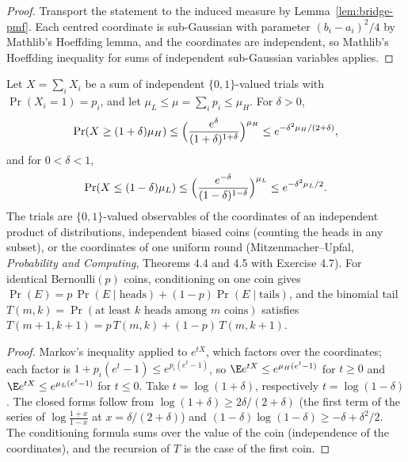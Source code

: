 \begin{proof}\leanok
Transport the statement to the induced measure by Lemma~\ref{lem:bridge-pmf}. Each centred
coordinate is sub-Gaussian with parameter $(b_i-a_i)^2/4$ by Mathlib's Hoeffding lemma, and the
coordinates are independent, so Mathlib's Hoeffding inequality for sums of independent
sub-Gaussian variables applies.
\end{proof}
\begin{theorem}\label{thm:chernoff}
\leanok{}
Let $X=\sum_iX_i$ be a sum of independent $\{0,1\}$-valued trials with
$\Pr(X_i=1)=p_i$, and let $\mu_L\le\mu=\sum_ip_i\le\mu_H$. For $\delta>0$,
\[\Pr(X\ge(1+\delta)\mu_H)\le\Bigl(\frac{e^{\delta}}{(1+\delta)^{1+\delta}}\Bigr)^{\mu_H}
\le e^{-\delta^2\mu_H/(2+\delta)},\]
and for $0<\delta<1$,
\[\Pr(X\le(1-\delta)\mu_L)\le\Bigl(\frac{e^{-\delta}}{(1-\delta)^{1-\delta}}\Bigr)^{\mu_L}
\le e^{-\delta^2\mu_L/2}.\]
The trials are $\{0,1\}$-valued observables of the coordinates of an independent
product of distributions, independent biased coins (counting the heads in any
subset), or the coordinates of one uniform round (Mitzenmacher--Upfal,
\emph{Probability and Computing}, Theorems 4.4 and 4.5 with Exercise 4.7).
For identical Bernoulli$(p)$ coins, conditioning on one coin gives
$\Pr(E)=p\,\Pr(E\mid\text{heads})+(1-p)\Pr(E\mid\text{tails})$, and the binomial tail
$T(m,k)=\Pr(\text{at least $k$ heads among $m$ coins})$ satisfies
$T(m+1,k+1)=p\,T(m,k)+(1-p)\,T(m,k+1)$.
\end{theorem}
\begin{proof}\leanok
Markov's inequality applied to $e^{tX}$, which factors over the coordinates; each
factor is $1+p_i(e^t-1)\le e^{p_i(e^t-1)}$, so $\E e^{tX}\le e^{\mu_H(e^t-1)}$ for
$t\ge0$ and $\E e^{tX}\le e^{\mu_L(e^t-1)}$ for $t\le0$. Take $t=\log(1+\delta)$,
respectively $t=\log(1-\delta)$. The closed forms follow from
$\log(1+\delta)\ge2\delta/(2+\delta)$ (the first term of the series of
$\log\frac{1+x}{1-x}$ at $x=\delta/(2+\delta)$) and
$(1-\delta)\log(1-\delta)\ge-\delta+\delta^2/2$. The conditioning formula sums over the
value of the coin (independence of the coordinates), and the recursion of $T$ is the case of
the first coin.
\end{proof}
